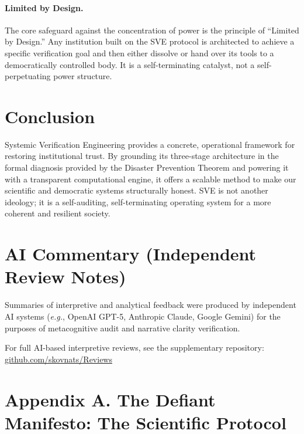 \documentclass[11pt,a4paper]{article}
\theoremstyle{definition}
\begin{document}
\paragraph{Limited by Design.} The core safeguard against the concentration of power is the principle of ``Limited by Design.'' Any institution built on the SVE protocol is architected to achieve a specific verification goal and then either dissolve or hand over its tools to a democratically controlled body. It is a self-terminating catalyst, not a self-perpetuating power structure.

\section{Conclusion}

Systemic Verification Engineering provides a concrete, operational framework for restoring institutional trust. By grounding its three-stage architecture in the formal diagnosis provided by the Disaster Prevention Theorem and powering it with a transparent computational engine, it offers a scalable method to make our scientific and democratic systems structurally honest. SVE is not another ideology; it is a self-auditing, self-terminating operating system for a more coherent and resilient society.

\section*{AI Commentary (Independent Review Notes)}
Summaries of interpretive and analytical feedback were produced by independent AI systems 
(\textit{e.g.}, OpenAI GPT-5, Anthropic Claude, Google Gemini) 
for the purposes of metacognitive audit and narrative clarity verification.  

For full AI-based interpretive reviews, see the supplementary repository:  
\href{https://codeberg.org/skovnats/SVE-Systemic-Verification-Engineering/tree/master/Reviews}{github.com/skovnats/Reviews}






\clearpage %
\appendix



\section*{Appendix A. The Defiant Manifesto: The Scientific Protocol}
\label{app:manifesto}
\end{document}
